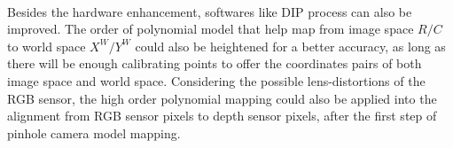 \\\indent
Besides the hardware enhancement, softwares like DIP process can also be improved. The order of polynomial model that help map from image space \(R/C\) to world space \(X^W/Y^W\) could also be heightened for a better accuracy, as long as there will be enough calibrating points to offer the coordinates pairs of both image space and world space. Considering the possible lens-distortions of the RGB sensor, the high order polynomial mapping could also be applied into the alignment from RGB sensor pixels to depth sensor pixels, after the first step of pinhole camera model mapping.
































